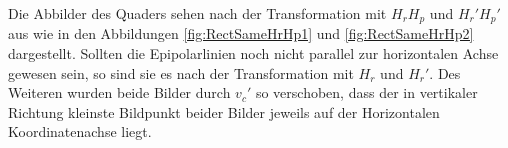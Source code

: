 Die Abbilder des Quaders sehen nach der Transformation mit $H_rH_p$ und $H_r'H_p'$ aus wie in den Abbildungen \ref{fig:RectSameHrHp1} und \ref{fig:RectSameHrHp2} dargestellt. Sollten die Epipolarlinien noch nicht parallel zur horizontalen Achse gewesen sein, so sind sie es nach der Transformation mit $H_r$ und $H_r'$. Des Weiteren wurden beide Bilder durch $v_c'$ so verschoben, dass der in vertikaler Richtung kleinste Bildpunkt beider Bilder jeweils auf der Horizontalen Koordinatenachse liegt. 


